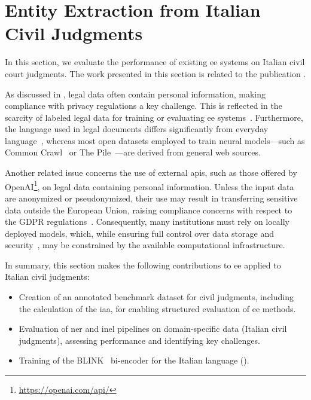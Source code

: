 \section[Entity Extraction from Italian Civil Judgments][EE from Italian Judgments]{Entity Extraction from Italian Civil Judgments}
\label{sec:eejudgements}

In this section, we evaluate the performance of existing \acf{ee} systems on Italian civil court judgments.
The work presented in this section is related to the publication \textcite{BELLANDI2024}.

As discussed in , legal data often contain personal information, making compliance with privacy regulations a key challenge. This is reflected in the scarcity of labeled legal data for training or evaluating \ac{ee} systems~\cite{li-etal-2022-parameter}. Furthermore, the language used in legal documents differs significantly from everyday language~\cite{ccetindaug2023name_legal_turkish}, whereas most open datasets employed to train neural models---such as Common Crawl~\cite{commoncrawl} or The Pile~\cite{gao2020pile800gbdatasetdiverse}---are derived from general web sources.

Another related issue concerns the use of external \acp{api}, such as those offered by OpenAI\footnote{\url{https://openai.com/api/}}, on legal data containing personal information. Unless the input data are anonymized or pseudonymized, their use may result in transferring sensitive data outside the European Union, raising compliance concerns with respect to the GDPR regulations~\cite[Art.~44--49]{gdpr2016}. Consequently, many institutions must rely on locally deployed models, which, while ensuring full control over data storage and security~\cite[Art.~32]{gdpr2016}, may be constrained by the available computational infrastructure.

In summary, this section makes the following contributions to \acl{ee} applied to Italian civil judgments:
\begin{itemize}
    \item Creation of an annotated benchmark dataset for civil judgments, including the calculation of the \acf{iaa}, for enabling structured evaluation of \acl{ee} methods.
    \item Evaluation of \acl{ner} and \acf{inel} pipelines on domain-specific data (Italian civil judgments), assessing performance and identifying key challenges.
    \item Training of the BLINK~\cite{blink} bi-encoder for the Italian language (\blinkita).
\end{itemize}

